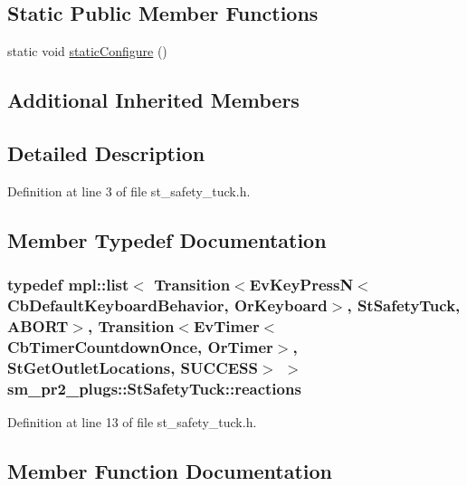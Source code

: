 \subsection*{Static Public Member Functions}
\begin{DoxyCompactItemize}
\item 
static void \hyperlink{structsm__pr2__plugs_1_1StSafetyTuck_a0682a377d9ef4f79963011de6e3acc9d}{static\+Configure} ()
\end{DoxyCompactItemize}
\subsection*{Additional Inherited Members}


\subsection{Detailed Description}


Definition at line 3 of file st\+\_\+safety\+\_\+tuck.\+h.



\subsection{Member Typedef Documentation}
\subsubsection[{\texorpdfstring{reactions}{reactions}}]{\setlength{\rightskip}{0pt plus 5cm}typedef mpl\+::list$<$ Transition$<$Ev\+Key\+PressN$<$Cb\+Default\+Keyboard\+Behavior, {\bf Or\+Keyboard}$>$, {\bf St\+Safety\+Tuck}, {\bf A\+B\+O\+RT}$>$, Transition$<$Ev\+Timer$<$Cb\+Timer\+Countdown\+Once, {\bf Or\+Timer}$>$, {\bf St\+Get\+Outlet\+Locations}, {\bf S\+U\+C\+C\+E\+SS}$>$ $>$ {\bf sm\+\_\+pr2\+\_\+plugs\+::\+St\+Safety\+Tuck\+::reactions}}\hypertarget{structsm__pr2__plugs_1_1StSafetyTuck_a6162ef008d6b48278427d85e91a926c8}{}\label{structsm__pr2__plugs_1_1StSafetyTuck_a6162ef008d6b48278427d85e91a926c8}


Definition at line 13 of file st\+\_\+safety\+\_\+tuck.\+h.



\subsection{Member Function Documentation}
